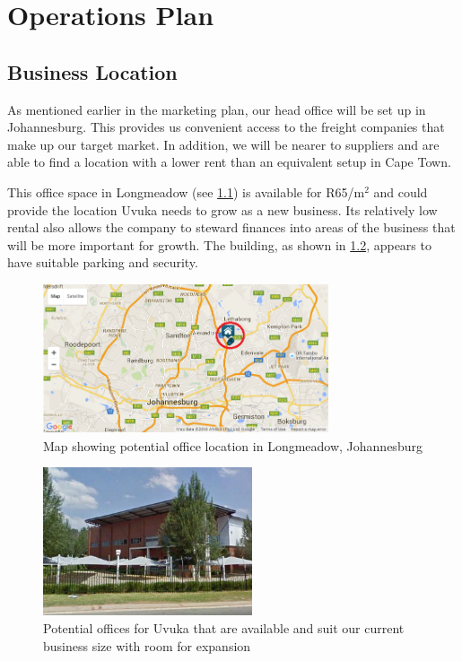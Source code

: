 \newpage

\chapter{Operations Plan}
\section{Business Location}
As mentioned earlier in the marketing plan, our head office will be set up in Johannesburg. This provides us convenient access to the freight companies that make up our target market. In addition, we will be nearer to suppliers and are able to find a location with a lower rent than an equivalent setup in Cape Town.

This office space in Longmeadow (see \cref{fig:map}) is available for R65/m$^2$ and could provide the location Uvuka needs to grow as a new business. Its relatively low rental also allows the company to steward finances into areas of the business that will be more important for growth. The building, as shown in \cref{fig:offices}, appears to have suitable parking and security.

\begin{figure}[H]
\centering
\includegraphics[width=0.75\textwidth]{images/offices_map.PNG}
\vskip10pt
\caption[Map showing potential office location in Longmeadow, north of Johannesburg]{Map showing potential office location in Longmeadow, Johannesburg}
\label{fig:map}
\end{figure}

\begin{figure}[H]
\centering
\includegraphics[width=0.55\textwidth]{images/offices_building.PNG}
\vskip10pt
\caption[Potential offices for Uvuka]{Potential offices for Uvuka that are available and suit our current business size with room for expansion}
\label{fig:offices}
\end{figure}

